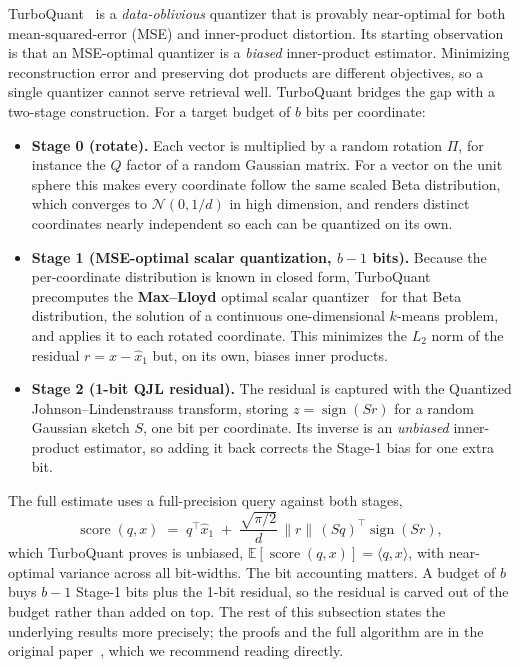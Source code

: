 \documentclass[11pt]{article}
\begin{document}
TurboQuant~\cite{turboquant2026} is a \emph{data-oblivious} quantizer that is provably near-optimal for both mean-squared-error (MSE) and inner-product distortion. Its starting observation is that an MSE-optimal quantizer is a \emph{biased} inner-product estimator. Minimizing reconstruction error and preserving dot products are different objectives, so a single quantizer cannot serve retrieval well. TurboQuant bridges the gap with a two-stage construction. For a target budget of $b$ bits per coordinate:
\begin{itemize}
  \item \textbf{Stage 0 (rotate).} Each vector is multiplied by a random rotation $\Pi$, for instance the $Q$ factor of a random Gaussian matrix. For a vector on the unit sphere this makes every coordinate follow the same scaled Beta distribution, which converges to $\mathcal{N}(0, 1/d)$ in high dimension, and renders distinct coordinates nearly independent so each can be quantized on its own.
  \item \textbf{Stage 1 (MSE-optimal scalar quantization, $b-1$ bits).} Because the per-coordinate distribution is known in closed form, TurboQuant precomputes the \textbf{Max--Lloyd} optimal scalar quantizer~\cite{lloyd1982, max1960} for that Beta distribution, the solution of a continuous one-dimensional $k$-means problem, and applies it to each rotated coordinate. This minimizes the $L_2$ norm of the residual $r = x - \hat{x}_1$ but, on its own, biases inner products.
  \item \textbf{Stage 2 (1-bit QJL residual).} The residual is captured with the Quantized Johnson--Lindenstrauss transform, storing $z = \operatorname{sign}(S r)$ for a random Gaussian sketch $S$, one bit per coordinate. Its inverse is an \emph{unbiased} inner-product estimator, so adding it back corrects the Stage-1 bias for one extra bit.
\end{itemize}
The full estimate uses a full-precision query against both stages,
\begin{equation}
\operatorname{score}(q, x) \;=\; q^\top \hat{x}_1 \;+\; \frac{\sqrt{\pi/2}}{d}\,\|r\|\,(Sq)^\top \operatorname{sign}(S r),
\end{equation}
which TurboQuant proves is unbiased, $\mathbb{E}[\operatorname{score}(q,x)] = \langle q, x\rangle$, with near-optimal variance across all bit-widths. The bit accounting matters. A budget of $b$ buys $b-1$ Stage-1 bits plus the 1-bit residual, so the residual is carved out of the budget rather than added on top. The rest of this subsection states the underlying results more precisely; the proofs and the full algorithm are in the original paper~\cite{turboquant2026}, which we recommend reading directly.
\end{document}

